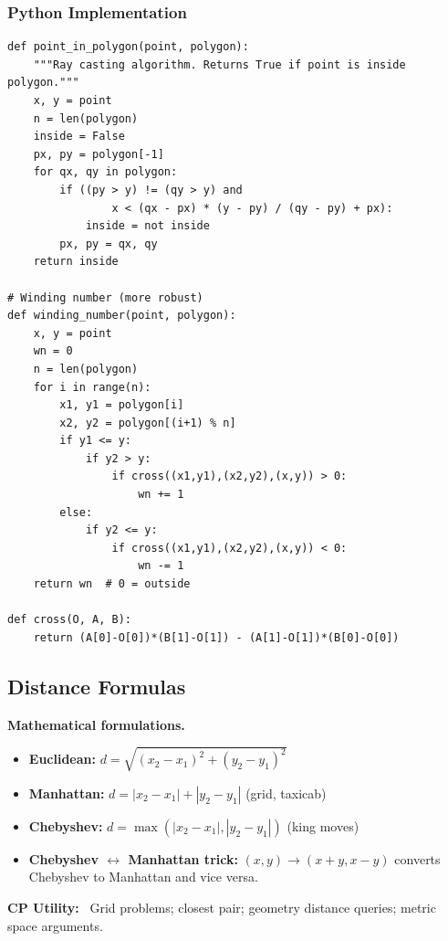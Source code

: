 \documentclass[10pt,a4paper]{article}
\theoremstyle{cpstyle}
\newenvironment{cputility}{%
  \begin{mdframed}[backgroundcolor=theorembg, linecolor=accent!50, linewidth=1pt,
    innerleftmargin=10pt, innerrightmargin=10pt, innertopmargin=6pt, innerbottommargin=6pt]
  \textbf{\color{accent}CP Utility:}~}{%
  \end{mdframed}}
\begin{document}
\subsubsection{Python Implementation}
\begin{lstlisting}[caption={Point-in-polygon ray casting}]
def point_in_polygon(point, polygon):
    """Ray casting algorithm. Returns True if point is inside polygon."""
    x, y = point
    n = len(polygon)
    inside = False
    px, py = polygon[-1]
    for qx, qy in polygon:
        if ((py > y) != (qy > y) and
                x < (qx - px) * (y - py) / (qy - py) + px):
            inside = not inside
        px, py = qx, qy
    return inside

# Winding number (more robust)
def winding_number(point, polygon):
    x, y = point
    wn = 0
    n = len(polygon)
    for i in range(n):
        x1, y1 = polygon[i]
        x2, y2 = polygon[(i+1) % n]
        if y1 <= y:
            if y2 > y:
                if cross((x1,y1),(x2,y2),(x,y)) > 0:
                    wn += 1
        else:
            if y2 <= y:
                if cross((x1,y1),(x2,y2),(x,y)) < 0:
                    wn -= 1
    return wn  # 0 = outside

def cross(O, A, B):
    return (A[0]-O[0])*(B[1]-O[1]) - (A[1]-O[1])*(B[0]-O[0])
\end{lstlisting}

\subsection{Distance Formulas}

\textbf{Mathematical formulations.}
\begin{itemize}[noitemsep]
  \item \textbf{Euclidean:} $d = \sqrt{(x_2-x_1)^2 + (y_2-y_1)^2}$
  \item \textbf{Manhattan:} $d = |x_2-x_1| + |y_2-y_1|$ (grid, taxicab)
  \item \textbf{Chebyshev:} $d = \max(|x_2-x_1|, |y_2-y_1|)$ (king moves)
  \item \textbf{Chebyshev $\leftrightarrow$ Manhattan trick:} $(x,y) \to (x+y, x-y)$ converts Chebyshev to Manhattan and vice versa.
\end{itemize}

\begin{cputility}
Grid problems; closest pair; geometry distance queries; metric space arguments.
\end{cputility}
\end{document}
